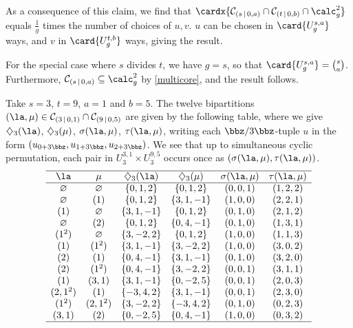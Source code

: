 \documentclass[a4paper, 11pt, twoside]{article}
\begin{document}
\begin{pf}
As a consequence of this claim, we find that $\cardx{\bc sa\cap\bc tb\cap\smash{\cores g^2}}$ equals $\frac1g$ times the number of choices of $u,v$. $u$ can be chosen in $\card{U_g^{s,a}}$ ways, and $v$ in $\card{U_g^{t,b}}$ ways, giving the result.

For the special case where $s$ divides $t$, we have $g=s$, so that $\card{U_g^{s,a}}=\binom sa$. Furthermore, $\bc sa\subseteq\cores g^2$ by \cref{multicore}, and the result follows.
\end{pf}

\begin{eg}
Take $s=3$, $t=9$, $a=1$ and $b=5$. The twelve bipartitions $(\la,\mu)\in\bc31\cap\bc95$ are given by the following table, where we give $\se3\la$, $\diamondsuit_{3}(\mu)$, $\sigma(\la,\mu)$, $\tau(\la,\mu)$, writing each $\bbz/3\bbz$-tuple $u$ in the form $(u_{0+3\bbz},u_{1+3\bbz},u_{2+3\bbz})$. We see that up to simultaneous cyclic permutation, each pair in $U_3^{3,1}\times U_3^{9,5}$ occurs once as $(\sigma(\la,\mu),\tau(\la,\mu))$.
\[
\begin{array}{cccccc}\hline
\la&\mu&\se3\la&\se3\mu&\sigma(\la,\mu)&\tau(\la,\mu)\\\hline
\varnothing&\varnothing&\{0,1,2\}&\{0,1,2\}&(0,0,1)&(1,2,2)\\
\varnothing&(1)&\{0,1,2\}&\{3,1,-1\}&(1,0,0)&(2,2,1)\\
(1)&\varnothing&\{3,1,-1\}&\{0,1,2\}&(0,1,0)&(2,1,2)\\
\varnothing&(2)&\{0,1,2\}&\{0,4,-1\}&(0,1,0)&(1,3,1)\\
(1^2)&\varnothing&\{3,-2,2\}&\{0,1,2\}&(1,0,0)&(1,1,3)\\
(1)&(1^2)&\{3,1,-1\}&\{3,-2,2\}&(1,0,0)&(3,0,2)\\
(2)&(1)&\{0,4,-1\}&\{3,1,-1\}&(0,1,0)&(3,2,0)\\
(2)&(1^2)&\{0,4,-1\}&\{3,-2,2\}&(0,0,1)&(3,1,1)\\
(1)&(3,1)&\{3,1,-1\}&\{0,-2,5\}&(0,0,1)&(2,0,3)\\
(2,1^2)&(1)&\{-3,4,2\}&\{3,1,-1\}&(0,0,1)&(2,3,0)\\
(1^2)&(2,1^2)&\{3,-2,2\}&\{-3,4,2\}&(0,1,0)&(0,2,3)\\
(3,1)&(2)&\{0,-2,5\}&\{0,4,-1\}&(1,0,0)&(0,3,2)\\\hline
\end{array}
\]
\end{eg}
\end{document}
